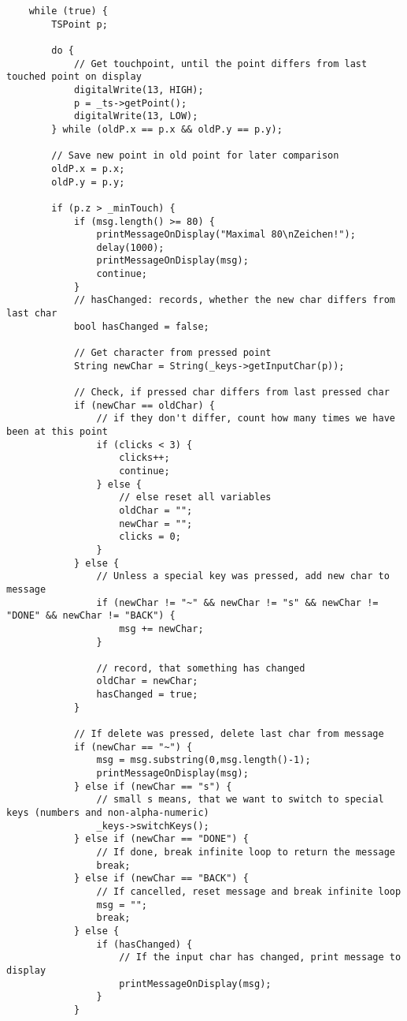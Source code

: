 \documentclass[a4paper, 11pt]{scrartcl}
\begin{document}
\begin{lstlisting}
    while (true) {
        TSPoint p;

        do {
            // Get touchpoint, until the point differs from last touched point on display
            digitalWrite(13, HIGH);
            p = _ts->getPoint();
            digitalWrite(13, LOW);     
        } while (oldP.x == p.x && oldP.y == p.y);
        
        // Save new point in old point for later comparison
        oldP.x = p.x;
        oldP.y = p.y;

        if (p.z > _minTouch) {
            if (msg.length() >= 80) {
                printMessageOnDisplay("Maximal 80\nZeichen!");
                delay(1000);
                printMessageOnDisplay(msg);
                continue;
            }
            // hasChanged: records, whether the new char differs from last char
            bool hasChanged = false;

            // Get character from pressed point
            String newChar = String(_keys->getInputChar(p));
            
            // Check, if pressed char differs from last pressed char
            if (newChar == oldChar) {
                // if they don't differ, count how many times we have been at this point
                if (clicks < 3) {
                    clicks++;
                    continue;
                } else {
                    // else reset all variables
                    oldChar = "";
                    newChar = "";
                    clicks = 0;
                }
            } else {
                // Unless a special key was pressed, add new char to message
                if (newChar != "~" && newChar != "s" && newChar != "DONE" && newChar != "BACK") {
                    msg += newChar;
                }

                // record, that something has changed 
                oldChar = newChar;
                hasChanged = true;
            }

            // If delete was pressed, delete last char from message
            if (newChar == "~") {
                msg = msg.substring(0,msg.length()-1);
                printMessageOnDisplay(msg);
            } else if (newChar == "s") {
                // small s means, that we want to switch to special keys (numbers and non-alpha-numeric)
                _keys->switchKeys();
            } else if (newChar == "DONE") {
                // If done, break infinite loop to return the message
                break;
            } else if (newChar == "BACK") {
                // If cancelled, reset message and break infinite loop
                msg = "";
                break;
            } else {
                if (hasChanged) {
                    // If the input char has changed, print message to display
                    printMessageOnDisplay(msg);
                }
            }


\end{lstlisting}
\end{document}
